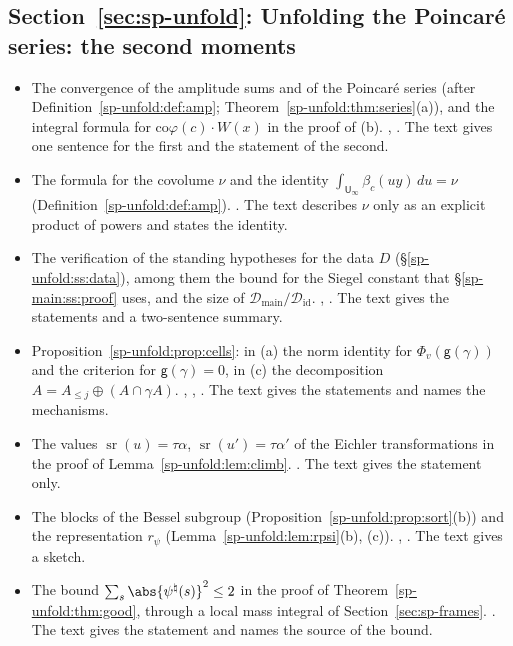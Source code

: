 \subsection*{Section~\ref{sec:sp-unfold}: Unfolding the Poincar\'e series: the second moments}
\begin{itemize}[leftmargin=2em,itemsep=1pt]
\item The convergence of the amplitude sums and of the Poincar\'e series (after
  Definition~\ref{sp-unfold:def:amp}; Theorem~\ref{sp-unfold:thm:series}(a)), and the integral
  formula for $\mathrm{co}\varphi(c)\cdot W(x)$ in the proof of (b).
  ,
  . The text gives one sentence for the
  first and the statement of the second.
\item The formula for the covolume $\nu$ and the identity $\int_{\mathsf
  U_\infty}\beta_c(uy)\,du=\nu$ (Definition~\ref{sp-unfold:def:amp}).
  . The text describes $\nu$ only as an
  explicit product of powers and states the identity.
\item The verification of the standing hypotheses for the data $D$ (\S\ref{sp-unfold:ss:data}), among them the bound for
  the Siegel constant that \S\ref{sp-main:ss:proof} uses, and the size of $\mathcal
  D_{\mathrm{main}}/\mathcal D_{\mathrm{id}}$. ,
  . The text gives the
  statements and a two-sentence summary.
\item Proposition~\ref{sp-unfold:prop:cells}: in (a) the norm identity for $\Phi_v(\mathsf
  g(\gamma))$ and the criterion for $\mathsf g(\gamma)=0$, in (c) the decomposition $A=A_{\le
  j}\oplus(A\cap\gamma A)$. ,
  ,
  . The text gives the statements and
  names the mechanisms.
\item The values $\operatorname{sr}(u)=\tau\alpha$, $\operatorname{sr}(u')=\tau\alpha'$ of the
  Eichler transformations in the proof of Lemma~\ref{sp-unfold:lem:climb}.
  . The text gives the statement only.
\item The blocks of the Bessel subgroup (Proposition~\ref{sp-unfold:prop:sort}(b)) and the
  representation $r_\psi$ (Lemma~\ref{sp-unfold:lem:rpsi}(b), (c)).
  ,
  . The text gives a sketch.
\item The bound $\sum_s\abs{\psi^\natural(s)}^2\le2$ in the proof of Theorem~\ref{sp-unfold:thm:good},
  through a local mass integral of Section~\ref{sec:sp-frames}.
  . The text gives the statement and names the
  source of the bound.
\end{itemize}

